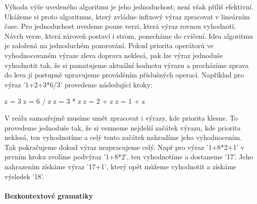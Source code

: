 
Výhoda výše uvedeného algoritmu je jeho jednoduchost; není však příliš efektivní.
Ukážeme si proto algoritmus, který zvládne infixový výraz zpracovat v lineárním
čase. Pro jednoduchost uvedeme pouze verzi, která výraz rovnou vyhodnotí. 
Návrh verze, která zároveň postaví i strom, ponecháme do cvičení. Idea algoritmu
je založená na jednoduchém pozorování. Pokud priorita operátorů ve vyhodnocovaném
výraze zleva doprava neklesá, pak lze výraz jednoduše vyhodnotit tak, že si
pamatujeme aktuální hodnotu výrazu a procházíme zprava do leva jí postupně 
upravujeme prováděním příslušných operací. Například pro výraz '1+2+3*6/3'
provedeme následující kroky:
\begin{python}
 z = 3
 z = 6 / z
 z = 3 * z
 z = 2 + z
 z = 1 + z
\end{python}
V reálu samozřejmě musíme umět zpracovat i výrazy, kde priorita klesne. To
provedeme jednoduše tak, že si vezmeme nejdelší začátek výrazu, kde 
priorita neklesá, ten vyhodnotíme a celý tento začátek nahradíme jeho vyhodnocením.
Tak pokračujeme dokud výraz nezpracujeme celý. Např pro výraz '1+8*2+1' 
v prvním kroku zvolíme podvýraz '1+8*2', ten vyhodnotíme a dostaneme '17'. Jeho
nahrazením získáme výraz '17+1', který opět můžeme vyhodnotit a získáme výsledek
'18'. 

\paragraph{Bezkontextové gramatiky}

\ifx\ucebnice\undefined

\fi
